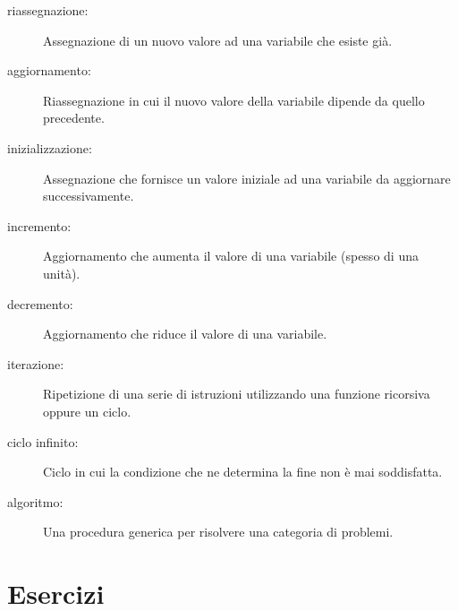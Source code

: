 \documentclass[10pt]{book}
\begin{document}
\begin{description}

\item[riassegnazione:] Assegnazione di un nuovo valore ad una variabile che  esiste già.

\item[aggiornamento:] Riassegnazione in cui il nuovo valore della variabile dipende da quello precedente.

\item[inizializzazione:] Assegnazione che fornisce un valore iniziale ad una variabile da aggiornare successivamente.

\item[incremento:] Aggiornamento che aumenta il valore di una variabile (spesso di una unità).

\item[decremento:] Aggiornamento che riduce il valore di una variabile.

\item[iterazione:] Ripetizione di una serie di istruzioni utilizzando una funzione ricorsiva oppure un ciclo.

\item[ciclo infinito:] Ciclo in cui la condizione che ne determina la fine non è mai soddisfatta.

\item[algoritmo:]  Una procedura generica per risolvere una categoria di problemi.

\end{description}


\section{Esercizi}
\end{document}
